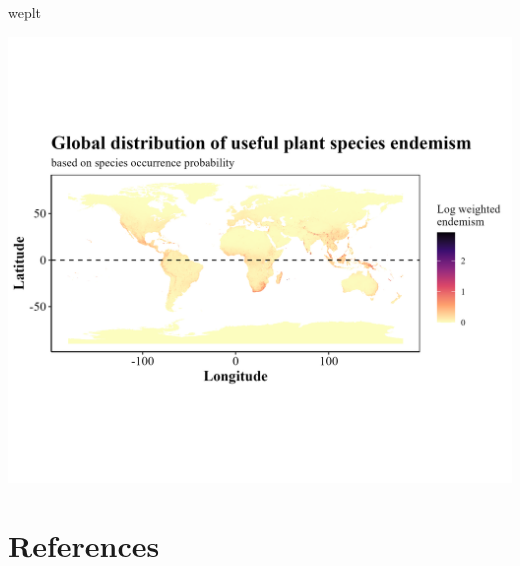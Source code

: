 \documentclass[
]{article}
\newenvironment{Shaded}{\begin{snugshade}}{\end{snugshade}}
\newcommand{\NormalTok}[1]{#1}
\begin{document}
\begin{Shaded}
\begin{Highlighting}[]
\NormalTok{weplt}
\end{Highlighting}
\end{Shaded}

\begin{center}\includegraphics[width=27.9in]{WE} \end{center}

\hypertarget{references}{%
\section*{References}\label{references}}
\end{document}
